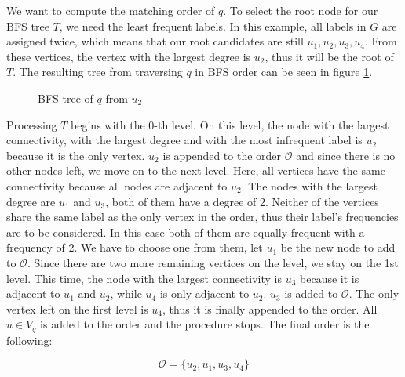 \begin{example}
    We want to compute the matching order
    of $q$. To select the root node for our BFS tree $T$, we need the least frequent labels. In this example,
    all labels in $G$ are assigned twice, which means that our root candidates are still $u_1, u_2, u_3, u_4$.
    From these vertices, the vertex with the largest degree is $u_2$, thus it will be the root of $T$.
    The resulting tree from traversing $q$ in BFS order can be seen in figure \ref{fig:vf2pporderbfs}.

    \begin{figure}[h!]
        \centering
        \caption{BFS tree of $q$ from $u_2$}
        \label{fig:vf2pporderbfs}
    \end{figure}

    Processing $T$ begins with the 0-th level. On this level, the node with the largest connectivity,
    with the largest degree and with the most infrequent label is $u_2$ because it is the only vertex.
    $u_2$ is appended to the order $\mathcal{O}$ and since there is no other nodes left, we move on to
    the next level. Here, all vertices have the same connectivity because all nodes are adjacent to $u_2$.
    The nodes with the largest degree are $u_1$ and $u_3$, both of them have a degree of 2. Neither of
    the vertices share the same label as the only vertex in the order, thus their label's frequencies are    
    to be considered. In this case both of them are equally frequent with a frequency of 2. We have to
    choose one from them, let $u_1$ be the new node to add to $\mathcal{O}$. Since there are two more
    remaining vertices on the level, we stay on the 1st level. This time, the node with the largest
    connectivity is $u_3$ because it is adjacent to $u_1$ and $u_2$, while $u_4$ is only adjacent to $u_2$.
    $u_3$ is added to $\mathcal{O}$. The only vertex left on the first level is $u_4$, thus it is finally
    appended to the order. All $u \in V_q$ is added to the order and the procedure stops. The final order
    is the following:

    \[ \mathcal{O} = \{u_2, u_1, u_3, u_4\} \]

\end{example}





